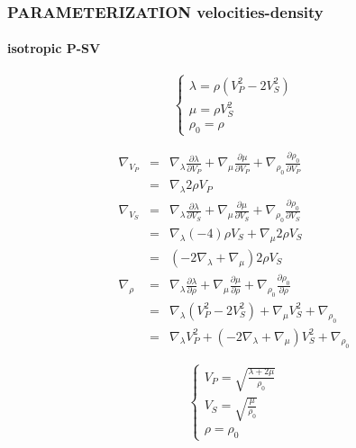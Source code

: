 \documentclass[9pt]{beamer}
\newcommand{\partderi}[2]{\frac{\partial#1}{\partial#2}}
\begin{document}
\begin{frame}\frametitle{PARAMETERIZATION velocities-density}
\framesubtitle{isotropic P-SV}
  
  \begin{minipage}{0.5\linewidth}
    \[\left\{ \begin{array}{l}
      \lambda = \rho (V_P^2-2V_S^2) \\
      \mu    = \rho V_S^2 \\
      \rho_0 = \rho 
    \end{array} \right.\]
    
    \begin{eqnarray}
      \nabla_{V_P} &=& \nabla_\lambda \partderi{\lambda}{V_P} + \nabla_\mu \partderi{\mu}{V_P} + \nabla_{\rho_0} \partderi{\rho_0}{V_P} \nonumber\\
                   &=& \nabla_\lambda 2\rho V_P \nonumber\\
      \nabla_{V_S} &=& \nabla_\lambda \partderi{\lambda}{V_S} + \nabla_\mu \partderi{\mu}{V_S} + \nabla_{\rho_0} \partderi{\rho_0}{V_S} \nonumber\\
                   &=& \nabla_\lambda (-4)\rho V_S + \nabla_\mu 2\rho V_S \nonumber\\
                   &=& \left(-2\nabla_\lambda + \nabla_\mu \right) 2\rho V_S \nonumber\\
      \nabla_{\rho} &=& \nabla_\lambda \partderi{\lambda}{\rho} + \nabla_\mu \partderi{\mu}{\rho} + \nabla_{\rho_0} \partderi{\rho_0}{\rho} \nonumber\\
		    &=& \nabla_\lambda (V_P^2-2V_S^2) + \nabla_\mu V_S^2 + \nabla_{\rho_0} \nonumber\\
		    &=& \nabla_\lambda V_P^2 + (-2\nabla_\lambda + \nabla_\mu)V_S^2  + \nabla_{\rho_0} \nonumber
    \end{eqnarray}

  \end{minipage} \vline
  \begin{minipage}{0.45\linewidth}
    \[\left\{ \begin{array}{l}
      V_P  = \sqrt{\frac{\lambda+2\mu}{\rho_0}} \\
      V_S  = \sqrt{\frac{\mu}{\rho_0}} \\
      \rho = \rho_0
    \end{array} \right.\]
    

\end{minipage}
\end{frame}
\end{document}
